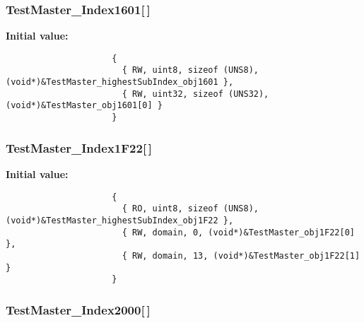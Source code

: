 \subsubsection{ {\bf Test\-Master\_\-Index1601}[$\,$]}\label{TestMasterSlave_2TestMaster_8c_c1a0836946c9eac65653e3590945b0f0}


\textbf{Initial value:}

\begin{Code}\begin{verbatim} 
                     {
                       { RW, uint8, sizeof (UNS8), (void*)&TestMaster_highestSubIndex_obj1601 },
                       { RW, uint32, sizeof (UNS32), (void*)&TestMaster_obj1601[0] }
                     }
\end{verbatim}\end{Code}
\subsubsection{ {\bf Test\-Master\_\-Index1F22}[$\,$]}\label{TestMasterSlave_2TestMaster_8c_19c3e7ea999590db0e1e4eb0d7684deb}


\textbf{Initial value:}

\begin{Code}\begin{verbatim} 
                     {
                       { RO, uint8, sizeof (UNS8), (void*)&TestMaster_highestSubIndex_obj1F22 },
                       { RW, domain, 0, (void*)&TestMaster_obj1F22[0] },
                       { RW, domain, 13, (void*)&TestMaster_obj1F22[1] }
                     }
\end{verbatim}\end{Code}
\subsubsection{ {\bf Test\-Master\_\-Index2000}[$\,$]}\label{TestMasterSlave_2TestMaster_8c_f1df85cf209408a358db50073027404e}


